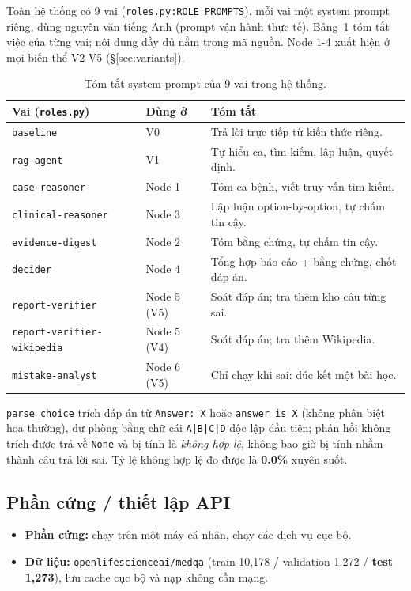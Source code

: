 \documentclass[11pt]{article}
\begin{document}
Toàn hệ thống có 9 vai (\texttt{roles.py:ROLE\_PROMPTS}), mỗi vai một system prompt riêng, dùng nguyên
văn tiếng Anh (prompt vận hành thực tế). Bảng~\ref{tab:roles} tóm tắt việc của từng vai; nội dung đầy đủ
nằm trong mã nguồn. Node 1-4 xuất hiện ở mọi biến thể V2-V5 (\S\ref{sec:variants}).

\begin{table}[h]
  \centering
  \caption{Tóm tắt system prompt của 9 vai trong hệ thống.}
  \label{tab:roles}
  \small
  \begin{tabular}{@{}p{}p{}p{}@{}}
    \toprule
    Vai (\texttt{roles.py}) & Dùng ở & Tóm tắt \\
    \midrule
    \texttt{baseline} & V0 & Trả lời trực tiếp từ kiến thức riêng. \\[3pt]
    \texttt{rag-agent} & V1 & Tự hiểu ca, tìm kiếm, lập luận, quyết định. \\[3pt]
    \texttt{case-reasoner} & Node 1 & Tóm ca bệnh, viết truy vấn tìm kiếm. \\[3pt]
    \texttt{clinical-reasoner} & Node 3 & Lập luận option-by-option, tự chấm tin cậy. \\[3pt]
    \texttt{evidence-digest} & Node 2 & Tóm bằng chứng, tự chấm tin cậy. \\[3pt]
    \texttt{decider} & Node 4 & Tổng hợp báo cáo + bằng chứng, chốt đáp án. \\[3pt]
    \texttt{report-verifier} & Node 5 (V5) & Soát đáp án; tra thêm kho câu từng sai. \\[3pt]
    \texttt{report-verifier-wikipedia} & Node 5 (V4) & Soát đáp án; tra thêm Wikipedia. \\[3pt]
    \texttt{mistake-analyst} & Node 6 (V5) & Chỉ chạy khi sai: đúc kết một bài học. \\
    \bottomrule
  \end{tabular}
\end{table}

\texttt{parse\_choice} trích đáp án từ \texttt{Answer: X} hoặc \texttt{answer is X} (không phân biệt hoa
thường), dự phòng bằng chữ cái \texttt{A|B|C|D} độc lập đầu tiên; phản hồi không trích được trả về
\texttt{None} và bị tính là \emph{không hợp lệ}, không bao giờ bị tính nhầm thành câu trả lời sai. Tỷ lệ không
hợp lệ đo được là \textbf{0.0\%} xuyên suốt.

\subsection{Phần cứng / thiết lập API}
\begin{itemize}[nosep]
  \item \textbf{Phần cứng:} chạy trên một máy cá nhân, chạy các dịch vụ cục bộ.
  \item \textbf{Dữ liệu:} \texttt{openlifescienceai/medqa} (train 10{,}178 / validation 1{,}272 /
  \textbf{test 1{,}273}), lưu cache cục bộ và nạp không cần mạng.
\end{itemize}
\end{document}
